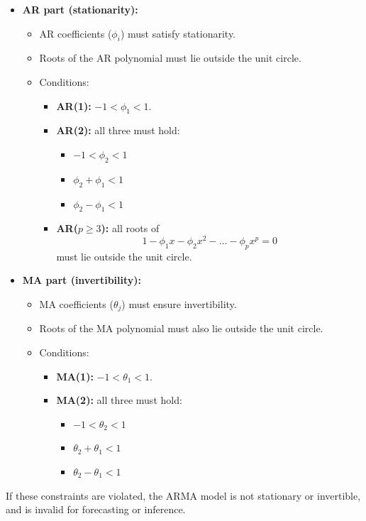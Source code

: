 \documentclass[12pt,a4paper]{article}
\begin{document}
\begin{itemize}
\item \textbf{AR part (stationarity):}
	\begin{itemize}
		\item AR coefficients ($\phi_i$) must satisfy stationarity.
		\item Roots of the AR polynomial must lie outside the unit circle.
		\item Conditions:
		\begin{itemize}
			\item \textbf{AR(1):} $-1 < \phi_1 < 1$.
			\item \textbf{AR(2):} all three must hold:
			\begin{itemize}
				\item $-1 < \phi_2 < 1$
				\item $\phi_2 + \phi_1 < 1$
				\item $\phi_2 - \phi_1 < 1$
			\end{itemize}
			\item \textbf{AR($p \geq 3$):} all roots of
			\[
			1 - \phi_1 x - \phi_2 x^2 - \dots - \phi_p x^p = 0
			\]
			must lie outside the unit circle.
		\end{itemize}
	\end{itemize}
	
\item \textbf{MA part (invertibility):}
	\begin{itemize}
		\item MA coefficients ($\theta_j$) must ensure invertibility.
		\item Roots of the MA polynomial must also lie outside the unit circle.
		\item Conditions:
		\begin{itemize}
			\item \textbf{MA(1):} $-1 < \theta_1 < 1$.
			\item \textbf{MA(2):} all three must hold:
			\begin{itemize}
				\item $-1 < \theta_2 < 1$
				\item $\theta_2 + \theta_1 < 1$
				\item $\theta_2 - \theta_1 < 1$
			\end{itemize}
		\end{itemize}
	\end{itemize}
\end{itemize}

If these constraints are violated, the ARMA model is not stationary or invertible, and is invalid for forecasting or inference.
\end{document}
